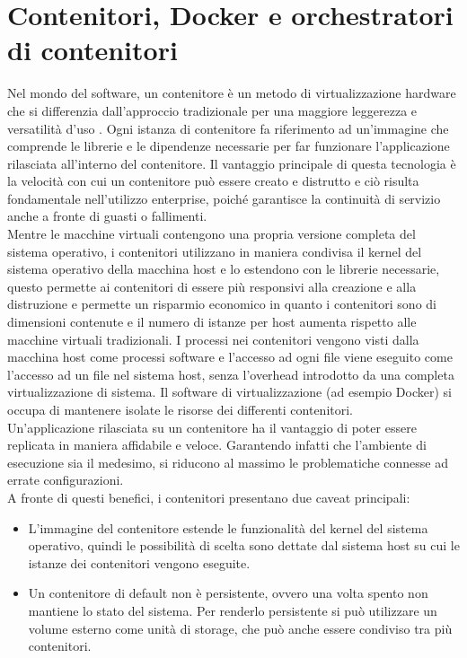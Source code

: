 \documentclass[a4paper, 12pt]{report}
\numberwithin{equation}{section}
\begin{document}
\section{Contenitori, Docker e orchestratori di contenitori}\label{containers}
Nel mondo del software, un contenitore è un metodo di virtualizzazione hardware che si differenzia dall’approccio tradizionale per una maggiore leggerezza e versatilità d’uso \cite{felter-containers}. Ogni istanza di contenitore fa riferimento ad un’immagine che comprende le librerie e le dipendenze necessarie per far funzionare l’applicazione rilasciata all’interno del contenitore. Il vantaggio principale di questa tecnologia è la velocità con cui un contenitore può essere creato e distrutto e ciò risulta fondamentale nell’utilizzo enterprise, poiché garantisce la continuità di servizio anche a fronte di guasti o fallimenti.\\
Mentre le macchine virtuali contengono una propria versione completa del sistema operativo, i contenitori utilizzano in maniera condivisa il kernel del sistema operativo della macchina host e lo estendono con le librerie necessarie, questo permette ai contenitori di essere più responsivi alla creazione e alla distruzione e permette un risparmio economico in quanto i contenitori sono di dimensioni contenute e il numero di istanze per host aumenta rispetto alle macchine virtuali tradizionali.
I processi nei contenitori vengono visti dalla macchina host come processi software e l’accesso ad ogni file viene eseguito come l’accesso ad un file nel sistema host, senza l’overhead introdotto da una completa virtualizzazione di sistema. Il software di virtualizzazione (ad esempio Docker) si occupa di mantenere isolate le risorse dei differenti contenitori.\\
Un’applicazione rilasciata su un contenitore ha il vantaggio di poter essere replicata in maniera affidabile e veloce. Garantendo infatti che l’ambiente di esecuzione sia il medesimo, si riducono al massimo le problematiche connesse ad errate configurazioni.\\
A fronte di questi benefici, i contenitori presentano due caveat principali:
\begin{itemize}
    \item L’immagine del contenitore estende le funzionalità del kernel del sistema operativo, quindi le possibilità di scelta sono dettate dal sistema host su cui le istanze dei contenitori vengono eseguite.
    \item Un contenitore di default non è persistente, ovvero una volta spento non mantiene lo stato del sistema. Per renderlo persistente si può utilizzare un volume esterno come unità di storage, che può anche essere condiviso tra più contenitori.
\end{itemize}
\end{document}
